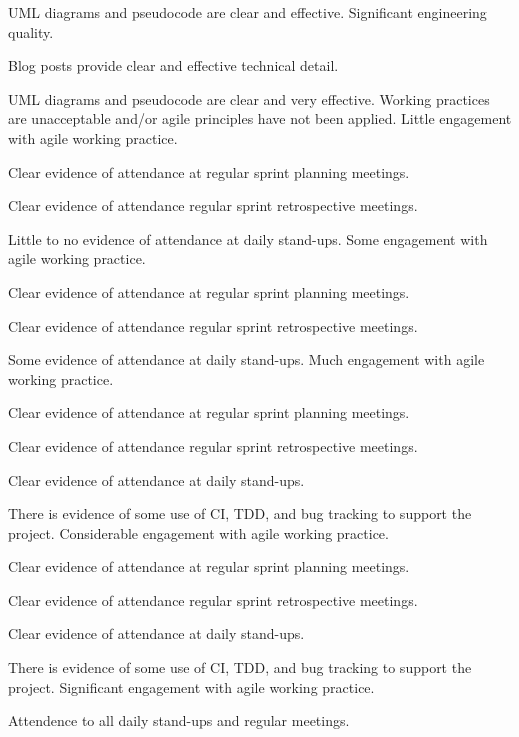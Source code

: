 \documentclass{../../fal_assignment}
\begin{document}
\begin{markingrubric}
            \par UML diagrams and pseudocode are clear and effective.
        \grade Significant engineering quality.
            \par Blog posts provide clear and effective technical detail.
            \par UML diagrams and pseudocode are clear and very effective.        
%
        \grade\fail Working practices are unacceptable and/or agile principles have not been applied.
        \grade Little engagement with agile working practice.
            \par Clear evidence of attendance at regular sprint planning meetings.
            \par Clear evidence of attendance regular sprint retrospective meetings.
            \par Little to no evidence of attendance at daily stand-ups.
        \grade Some engagement with agile working practice.
            \par Clear evidence of attendance at regular sprint planning meetings.
            \par Clear evidence of attendance regular sprint retrospective meetings.
            \par Some evidence of attendance at daily stand-ups.
        \grade Much engagement with agile working practice.
            \par Clear evidence of attendance at regular sprint planning meetings.
            \par Clear evidence of attendance regular sprint retrospective meetings.
            \par Clear evidence of attendance at daily stand-ups.
            \par There is evidence of some use of CI, TDD, and bug tracking to support the project.
        \grade Considerable engagement with agile working practice.
            \par Clear evidence of attendance at regular sprint planning meetings.
            \par Clear evidence of attendance regular sprint retrospective meetings.
            \par Clear evidence of attendance at daily stand-ups.
            \par There is evidence of some use of CI, TDD, and bug tracking to support the project.
        \grade Significant engagement with agile working practice.
            \par Attendence to all daily stand-ups and regular meetings.

\end{markingrubric}
\end{document}
